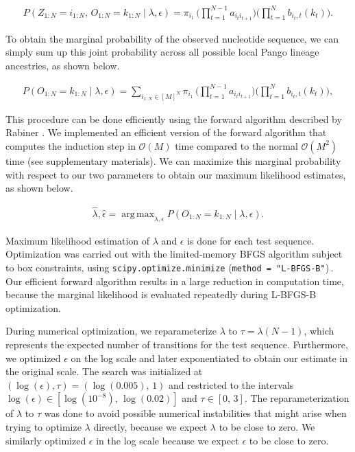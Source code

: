 \documentclass[11pt,oneside,letterpaper]{article}
\DeclareMathOperator*{\argmax}{arg\,max}
\newcommand{\States}{[M]} %
\begin{document}
\begin{align*}
    P(Z_{1:N}=i_{1:N},\,O_{1:N}=k_{1:N}\mid \lambda,\epsilon)
    = \pi_{i_1}\,\Bigg(\prod_{t=1}^{N-1} a_{i_t i_{t+1}}\Bigg)
    \Bigg(\prod_{t=1}^{N} b_{i_t,t}(k_t)\Bigg).
\end{align*}

To obtain the marginal probability of the observed nucleotide sequence, we can simply sum up this joint probability across all possible local Pango lineage ancestries, as shown below.

\begin{align*}
    P(O_{1:N}=k_{1:N}\mid \lambda,\epsilon)
    = \sum_{i_{1:N}\in\States^N} 
    \pi_{i_1}\,\Bigg(\prod_{t=1}^{N-1} a_{i_t i_{t+1}}\Bigg)
    \Bigg(\prod_{t=1}^{N} b_{i_t,t}(k_t)\Bigg),
\end{align*}

This procedure can be done efficiently using the forward algorithm described by Rabiner \cite{rabiner_tutorial_1989}. We implemented an efficient version of the forward algorithm that computes the induction step in $\mathcal{O}(M)$ time compared to the normal $\mathcal{O}(M^2)$ time (see supplementary materials). We can maximize this marginal probability with respect to our two parameters to obtain our maximum likelihood estimates, as shown below.

\begin{align*}
    \hat\lambda, \hat\epsilon = \argmax_{\lambda,\epsilon}P(O_{1:N} = k_{1:N} \mid\lambda,\epsilon).
\end{align*}

Maximum likelihood estimation of $\lambda$ and $\epsilon$ is done for each test sequence. Optimization was carried out with the limited-memory BFGS algorithm subject to box constraints, using \texttt{scipy.optimize.minimize} (\texttt{method = "L-BFGS-B"})\,\cite{virtanen_scipy_2020}. Our efficient forward algorithm results in a large reduction in computation time, because the marginal likelihood is evaluated repeatedly during L-BFGS-B optimization.

During numerical optimization, we reparameterize $\lambda$ to $\tau = \lambda(N-1)$, which represents the expected number of transitions for the test sequence. Furthermore, we optimized $\epsilon$ on the log scale and later exponentiated to obtain our estimate in the original scale. The search was initialized at $(\log(\epsilon),\tau) = (\log(0.005),\,1)$ and restricted to the intervals $\log(\epsilon) \in [\log(10^{-8}),\,\log(0.02)]$ and $\tau \in [0,\,3]$. The reparameterization of $\lambda$ to $\tau$ was done to avoid possible numerical instabilities that might arise when trying to optimize $\lambda$ directly, because we expect $\lambda$ to be close to zero. We similarly optimized $\epsilon$ in the log scale because we expect $\epsilon$ to be close to zero. 
\end{document}
